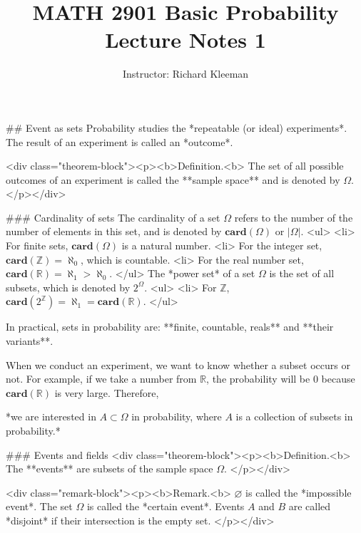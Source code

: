 


\title{MATH 2901 Basic Probability Lecture Notes 1}
\author{Instructor: Richard Kleeman}
\date{}
\maketitle


## Event as sets
Probability studies the *repeatable (or ideal) experiments*. The result of an experiment is called an *outcome*.

<div class="theorem-block"><p><b>Definition.<b> 
The set of all possible outcomes of an experiment is called the **sample space** and is denoted by $\Omega$.  
</p></div>

### Cardinality of sets
The cardinality of a set $\Omega$ refers to the number of the number of elements in this set, and is denoted by $\mathbf{card}(\Omega)$ or $\left\vert \Omega \right\vert$.
<ul>
    <li> For finite sets, $\mathbf{card}(\Omega)$ is a natural number.
    <li> For the integer set, $\mathbf{card}(\mathbb{Z}) = \aleph_0$, which is countable.
    <li> For the real number set, $\mathbf{card}(\mathbb{R}) = \aleph_1 > \aleph_0$.
</ul>
The *power set* of a set $\Omega$ is the set of all subsets, which is denoted by $2^\Omega$.
<ul>
    <li> For $\mathbb{Z}$, $\mathbf{card}(2^\mathbb{Z}) = \aleph_1 = \mathbf{card}(\mathbb{R})$.
</ul>

In practical, sets in probability are: **finite, countable, reals** and **their variants**.

When we conduct an experiment, we want to know whether a subset occurs or not. For example, if we take a number from $\mathbb{R}$, the probability will be 0 because $\mathbf{card}(\mathbb{R})$ is very large. Therefore,
\begin{center}
*we are interested in $A \subset \Omega$ in probability, where $A$ is a collection of subsets in probability.*
\end{center}

### Events and fields
<div class="theorem-block"><p><b>Definition.<b> 
The **events** are subsets of the sample space $\Omega$. 
</p></div>

<div class="remark-block"><p><b>Remark.<b> 
$\varnothing$ is called the *impossible event*. The set $\Omega$ is called the *certain event*. Events $A$ and $B$ are called *disjoint* if their intersection is the empty set.
</p></div>

